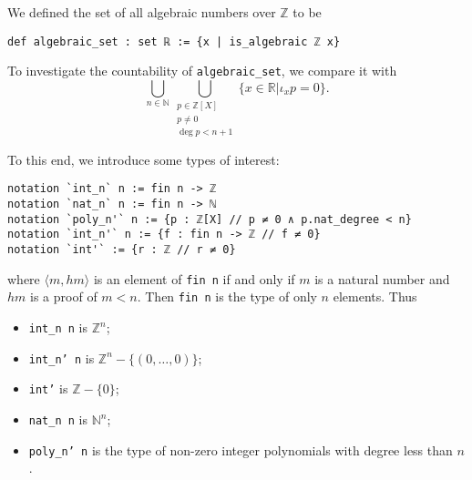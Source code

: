 \documentclass{report}
\theoremstyle{definition}
\theoremstyle{plain}
\begin{document}
We defined the set of all algebraic numbers over $\mathbb Z$ to be
\begin{verbatim}
def algebraic_set : set ℝ := {x | is_algebraic ℤ x}
\end{verbatim}
To investigate the countability of {\tt algebraic\_set}, we compare it with
\begin{equation}
  \bigcup_{n\in\mathbb N}\bigcup_{\substack{p\in\mathbb{Z}[X]\\ p\ne 0\\ \deg{p}<n+1}} \{x\in\mathbb{R}|\iota_xp=0\}.
  \label{countability:setEq}
\end{equation}


To this end, we introduce some types of interest:
\begin{verbatim}
notation `int_n` n := fin n -> ℤ
notation `nat_n` n := fin n -> ℕ
notation `poly_n'` n := {p : ℤ[X] // p ≠ 0 ∧ p.nat_degree < n}
notation `int_n'` n := {f : fin n -> ℤ // f ≠ 0}
notation `int'` := {r : ℤ // r ≠ 0}
\end{verbatim}

where  $\langle m, hm\rangle$ is an element of {\tt fin n} if and only if $m$ is a natural number and $hm$ is a proof of $m < n$. Then {\tt fin n} is the type of only $n$ elements. Thus
\begin{itemize}
  \item {\tt int\_n n} is $\mathbb Z^n$;
  \item {\tt int\_n' n} is $\mathbb Z^n-\{(0,\dots,0)\}$;
  \item {\tt int'} is $\mathbb Z-\{0\}$;
  \item {\tt nat\_n n} is $\mathbb N^n$;
  \item {\tt poly\_n' n} is the type of non-zero integer polynomials with degree less than $n$.
\end{itemize}
\end{document}
